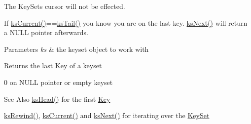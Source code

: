 The Key\-Sets cursor will not be effected.

If \hyperlink{group__keyset_ga4287b9416912c5f2ab9c195cb74fb094}{ks\-Current()}==\hyperlink{group__keyset_gadca442c4ab43cf532b15091d7711559e}{ks\-Tail()} you know you are on the last key. \hyperlink{group__keyset_ga317321c9065b5a4b3e33fe1c399bcec9}{ks\-Next()} will return a N\-U\-L\-L pointer afterwards.


\begin{DoxyParams}{Parameters}
{\em ks} & the keyset object to work with \\
\hline
\end{DoxyParams}
\begin{DoxyReturn}{Returns}
the last Key of a keyset 

0 on N\-U\-L\-L pointer or empty keyset 
\end{DoxyReturn}
\begin{DoxySeeAlso}{See Also}
\hyperlink{group__keyset_gae7dbf3aef70e67b5328475eb3d1f92f5}{ks\-Head()} for the first \hyperlink{group__key}{Key} 

\hyperlink{group__keyset_gabe793ff51f1728e3429c84a8a9086b70}{ks\-Rewind()}, \hyperlink{group__keyset_ga4287b9416912c5f2ab9c195cb74fb094}{ks\-Current()} and \hyperlink{group__keyset_ga317321c9065b5a4b3e33fe1c399bcec9}{ks\-Next()} for iterating over the \hyperlink{group__keyset}{Key\-Set} 
\end{DoxySeeAlso}
